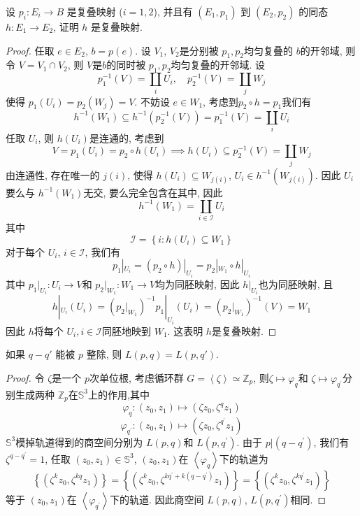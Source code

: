 \documentclass[../main.tex]{subfiles}
\begin{document}
\begin{exercise}{}{}
设 $p_i: E_i \to B$ 是复叠映射 ($i=1,2$), 并且有 $(E_1, p_1)$ 到 $(E_2, p_2)$ 的同态 $h: E_1 \to E_2$, 证明 $h$ 是复叠映射.
\end{exercise}
\begin{proof}
任取 $e\in E_2$, $b =p\left(e\right)$. 设 $V_1$, $V_2$是分别被 $p_1,p_2$均匀复叠的 $b$的开邻域, 则令 $V =V_1\cap V_2$, 则 $V$是$b$的同时被 $p_1,p_2$均匀复叠的开邻域. 设
 $$ p_1^{-1} \left(V\right) =\coprod  _{i}U_{i},\quad p_2^{-1} \left(V\right) =\coprod  _{j}W_{j} $$
使得 $p_1\left(U_{i}\right) =p_2\left(W_{j}\right) =V$. 不妨设 $e\in W_{1}$, 考虑到$p_2\circ h  =p_1$我们有
 $$ h^{-1} \left(W_1\right)\subseteq h^{-1} \left(p_2^{-1} \left(V\right)\right) =p_1^{-1} \left(V\right) =\coprod  _{i}U_{i} $$
任取 $U_{i}$, 则 $h\left(U_{i}\right)$是连通的, 考虑到
 $$V =p_1\left(U_{i}\right) =p_2\circ h \left(U_{i}\right)\implies  h\left(U_i\right)\subseteq p_2^{-1} \left(V\right) =\coprod _{j}W_{j} $$
由连通性, 存在唯一的 $j\left(i\right)$, 使得 $h\left(U_{i}\right)\subseteq W_{j\left(i\right)}$, $U_{i}\in h^{-1} \left(W_{j\left(i\right)}\right)$. 因此 $U_{i}$要么与 $h^{-1} \left(W_1\right)$无交, 要么完全包含在其中, 因此
 $$ h^{-1} \left(W_1\right) =\coprod  _{i\in \mathcal{I}}U_{i} $$
其中
 $$ \mathcal{I} =\left\{ i: h\left(U_{i}\right)\subseteq W_1 \right\} $$
对于每个 $U_{i}$, $i\in \mathcal{I}$, 我们有
 $$p_1|_{U_{i}} =\left(p_2\circ h\right)|_{U_{i}} =p_2|_{W_1}\circ h|_{U_{i}} $$
其中 $p_1|_{U_{i}}:U_{i}\to V$和 $p_2|_{W_1}:W_1\to V$均为同胚映射, 因此 $h|_{U_i}$也为同胚映射, 且
 $$ h|_{U_i}\left(U_i\right) =\left(p_2|_{W_1}\right)^{-1}  p_1|_{U_{i}} \left(U_{i}\right) =\left(p_2|_{W_1}\right)^{-1} \left(V\right) =W_1$$
因此 $h$将每个 $U_{i}, i\in \mathcal{I}$同胚地映到 $W_1$. 这表明 $h$是复叠映射.
\end{proof}
\begin{exercise}{}{}
如果 $q-q'$ 能被 $p$ 整除, 则 $L(p,q)=L(p,q')$.
\end{exercise}
\begin{proof}
令 $\zeta$是一个 $p$次单位根,
 考虑循环群 $G= \left< \zeta  \right>\simeq \mathbb{Z} _{p}$, 则$\zeta \mapsto \varphi _{q}$和 $\zeta \mapsto \varphi _{q^{\prime} }$分别生成两种 $\mathbb{Z} _{p}$在$\mathbb{S}^{3}$上的作用,其中
 $$ \varphi _{q}:\left(z_0,z_1\right)\mapsto \left(\zeta z_0, \zeta ^{q}z_1\right) $$
 $$ \varphi _{q^{\prime} }:\left(z_0,z_1\right)\mapsto \left(\zeta z_0, \zeta ^{q^{\prime} }z_1\right) $$
$\mathbb{S}^{3}$模掉轨道得到的商空间分别为 $L\left(p,q\right)$和 $L\left(p,q^{\prime} \right)$. 由于 $p|\left(q-q^{\prime} \right)$, 我们有 $\zeta ^{q-q^{\prime} }= 1$,
任取 $\left(z_0,z_1\right)\in \mathbb{S}^{3}$, $\left(z_0,z_1\right)$在 $\left< \varphi _{q} \right>$下的轨道为
 $$ \left\{ \left(\zeta ^{k}z_0, \zeta ^{kq}z_1\right) \right\} = \left\{ \left(\zeta ^{k}z_0,\zeta ^{kq^{\prime} + k\left(q-q^{\prime} \right)}z_1\right) \right\}= \left\{ \left(\zeta ^{k}z_0, \zeta ^{kq^{\prime} }z_1\right) \right\}$$
等于 $\left(z_0,z_1\right)$在 $\left< \varphi _{q^{\prime} } \right>$下的轨道. 因此商空间 $L\left(p,q\right)$, $L\left(p,q^{\prime} \right)$相同.
\end{proof}
\end{document}
